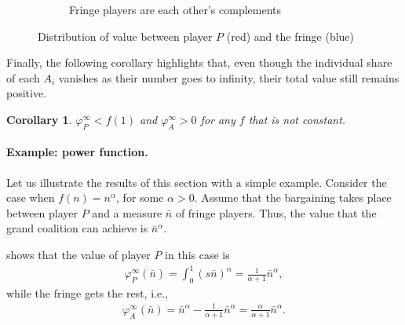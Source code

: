 \documentclass[a4paper]{article}
\newtheorem{corollary}{Corollary}
\begin{document}
\begin{figure}
\begin{subfigure}[b]{0.45\textwidth}
        \caption{Fringe players are each other's complements}
    \end{subfigure}
    \caption{Distribution of value between player $P$ (red) and the fringe (blue)}
    \label{fig:one_sided}
\end{figure}

Finally, the following corollary highlights that, even though the individual share of each $A_i$ vanishes as their number goes to infinity, their total value still remains positive.
\begin{corollary}
    \label{cor:fringe_value_2}
    $\varphi_P^\infty < f(1)$ and $\varphi_A^\infty > 0$ for any $f$ that is not constant.
\end{corollary}


\paragraph{Example: power function.}

Let us illustrate the results of this section with a simple example.
Consider the case when $f(n) = n^\alpha$, for some $\alpha > 0$.
Assume that the bargaining takes place between player $P$ and a measure $\bar{n}$ of fringe players.
Thus, the value that the grand coalition can achieve is $\bar{n}^\alpha$.

 shows that the value of player $P$ in this case is
\begin{align*}
    \varphi_P^\infty(\bar{n}) = \int_0^1 (s \bar{n})^\alpha = \frac{1}{\alpha + 1} \bar{n}^\alpha,
\end{align*}
while the fringe gets the rest, i.e.,
\begin{align*}
    \varphi_A^\infty(\bar{n}) = \bar{n}^\alpha - \frac{1}{\alpha + 1} \bar{n}^\alpha = \frac{\alpha}{\alpha + 1} \bar{n}^\alpha.
\end{align*}
\end{document}
